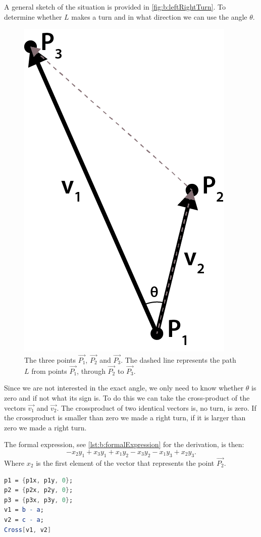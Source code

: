 A general sketch of the situation is provided in \autoref{fig:b:leftRightTurn}. To determine whether $L$ makes a turn and in what direction we can use the angle $\theta$.

\begin{figure}
	\centering
	\includegraphics[scale=1]{./img/b_leftRightTurn}
	\caption{The three points $\vec{P_1}$, $\vec{P_2}$ and $\vec{P_3}$. The dashed line represents the path $L$ from points $\vec{P_1}$, through $\vec{P_2}$ to $\vec{P_3}$.}
	\label{fig:b:leftRightTurn}
\end{figure}

Since we are not interested in the exact angle, we only need to know whether $\theta$ is zero and if not what its sign is. To do this we can take the cross-product of the vectors $\vec{v_1}$ and $\vec{v_2}$. The crossproduct of two identical vectors is, no turn, is zero. If the crossproduct is smaller than zero we made a right turn, if it is larger than zero we made a right turn.  

The formal expression, see \autoref{lst:b:formalExpression} for the derivation, is then:
\begin{equation}
	-x_2 y_1 + x_3 y_1 + x_1 y_2 - x_3 y_2 - x_1 y_3 + x_2 y_3.
\end{equation}
Where $x_2$ is the first element of the vector that represents the point $\vec{P_2}$.

\begin{lstlisting}[float, caption={Generation of the formal expression.}, label={lst:b:formalExpression}, language=Mathematica]
p1 = {p1x, p1y, 0};
p2 = {p2x, p2y, 0};
p3 = {p3x, p3y, 0};
v1 = b - a;
v2 = c - a;
Cross[v1, v2]
\end{lstlisting}



